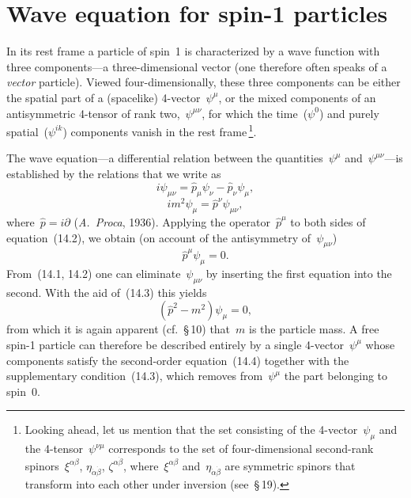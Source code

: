 \section{Wave equation for spin-1 particles}

In its rest frame a particle of spin~1 is characterized by a wave function with three components---a three-dimensional vector (one therefore often speaks of a \emph{vector} particle). Viewed four-dimensionally, these three components can be either the spatial part of a (spacelike) 4-vector~$\psi^\mu$, or the mixed components of an antisymmetric 4-tensor of rank two,~$\psi^{\mu\nu}$, for which the time~($\psi^0$) and purely spatial~($\psi^{ik}$) components vanish in the rest frame\,\footnote{Looking ahead, let us mention that the set consisting of the 4-vector~$\psi_\mu$ and the 4-tensor~$\psi^{\nu\mu}$ corresponds to the set of four-dimensional second-rank spinors~$\xi^{\alpha\beta}$, $\eta_{\dot\alpha\dot\beta}$, $\zeta^{\alpha\dot\beta}$, where~$\xi^{\alpha\beta}$ and~$\eta_{\dot\alpha\dot\beta}$ are symmetric spinors that transform into each other under inversion (see~\S\,19).}.

The wave equation---a differential relation between the quantities~$\psi^\mu$ and~$\psi^{\mu\nu}$---is established by the relations that we write as
\begin{equation}
i\psi_{\mu\nu} = \hat{p}_\mu\psi_\nu - \hat{p}_\nu\psi_\mu,
\tag{14.1}
\end{equation}
\begin{equation}
im^2\psi_\mu = \hat{p}^\nu\psi_{\mu\nu},
\tag{14.2}
\end{equation}
where~$\hat{p} = i\partial$ (\emph{A.~Proca}, 1936). Applying the operator~$\hat{p}^\mu$ to both sides of equation~(14.2), we obtain (on account of the antisymmetry of~$\psi_{\mu\nu}$)
\begin{equation}
\hat{p}^\mu\psi_\mu = 0.
\tag{14.3}
\end{equation}
From~(14.1, 14.2) one can eliminate~$\psi_{\mu\nu}$ by inserting the first equation into the second. With the aid of~(14.3) this yields
\begin{equation}
(\hat{p}^2 - m^2)\psi_\mu = 0,
\tag{14.4}
\end{equation}
from which it is again apparent (cf.~\S\,10) that~$m$ is the particle mass. A free spin-1 particle can therefore be described entirely by a single 4-vector~$\psi^\mu$ whose components satisfy the second-order equation~(14.4) together with the supplementary condition~(14.3), which removes from~$\psi^\mu$ the part belonging to spin~0.

